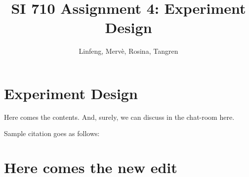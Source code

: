 \documentclass{article}
\title{SI 710 Assignment 4: Experiment Design}
\author{Linfeng, Merv\`e, Rosina, Tangren}
\date{}
\begin{document}
\maketitle

\section{Experiment Design}

Here comes the contents. And, surely, we can discuss in the chat-room here.

Sample citation goes as follows: \cite{adams1995hitchhiker}


\section{Here comes the new edit}



\end{document}
